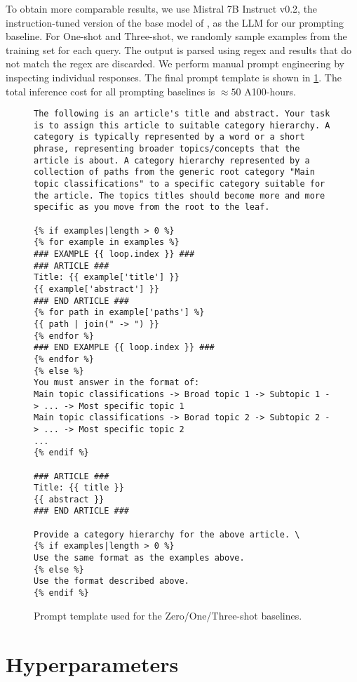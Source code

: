 To obtain more comparable results, we use Mistral 7B Instruct v0.2, the instruction-tuned version of the base model of \name, as the LLM for our prompting baseline. For One-shot and Three-shot, we randomly sample examples from the training set for each query. The output is parsed using regex and results that do not match the regex are discarded. We perform manual prompt engineering by inspecting individual responses. The final prompt template is shown in \cref{fig:prompt-template}. The total inference cost for all prompting baselines is $\approx 50$ A100-hours.



\begin{figure}
    \centering
    \begin{lstlisting}[frame=single]
The following is an article's title and abstract. Your task is to assign this article to suitable category hierarchy. A category is typically represented by a word or a short phrase, representing broader topics/concepts that the article is about. A category hierarchy represented by a collection of paths from the generic root category "Main topic classifications" to a specific category suitable for the article. The topics titles should become more and more specific as you move from the root to the leaf. 

{% if examples|length > 0 %}
{% for example in examples %}
### EXAMPLE {{ loop.index }} ###
### ARTICLE ###
Title: {{ example['title'] }}
{{ example['abstract'] }}
### END ARTICLE ###
{% for path in example['paths'] %}
{{ path | join(" -> ") }}
{% endfor %}
### END EXAMPLE {{ loop.index }} ###
{% endfor %}
{% else %}
You must answer in the format of:
Main topic classifications -> Broad topic 1 -> Subtopic 1 -> ... -> Most specific topic 1
Main topic classifications -> Borad topic 2 -> Subtopic 2 -> ... -> Most specific topic 2
...
{% endif %}

### ARTICLE ###
Title: {{ title }}
{{ abstract }}
### END ARTICLE ###

Provide a category hierarchy for the above article. \
{% if examples|length > 0 %}
Use the same format as the examples above.
{% else %}
Use the format described above.
{% endif %}
\end{lstlisting}
    \caption{Prompt template used for the Zero/One/Three-shot baselines.}
    \label{fig:prompt-template}
\end{figure}


\section{Hyperparameters}

